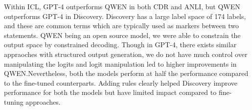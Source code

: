 Within ICL, GPT-4 outperforms QWEN in both CDR and ANLI, but QWEN outperforms GPT-4 in Discovery. Discovery has a large label space of 174 labels, and these are common terms which are typically used as markers between two statements. QWEN being an open source model, we were able to constrain the output space by constrained decoding.  Though in GPT-4, there exists similar appraoches with structured output generation, we do not have much control over manipulating the logits and logit manipulation led to higher improvements in QWEN.Nevertheless, both the models perform at half the performance compared to the fine-tuned counterparts. Adding rules clearly helped Discovery improve performance for both the models but have limited impact compared to fine-tuning approaches. 


 
 












